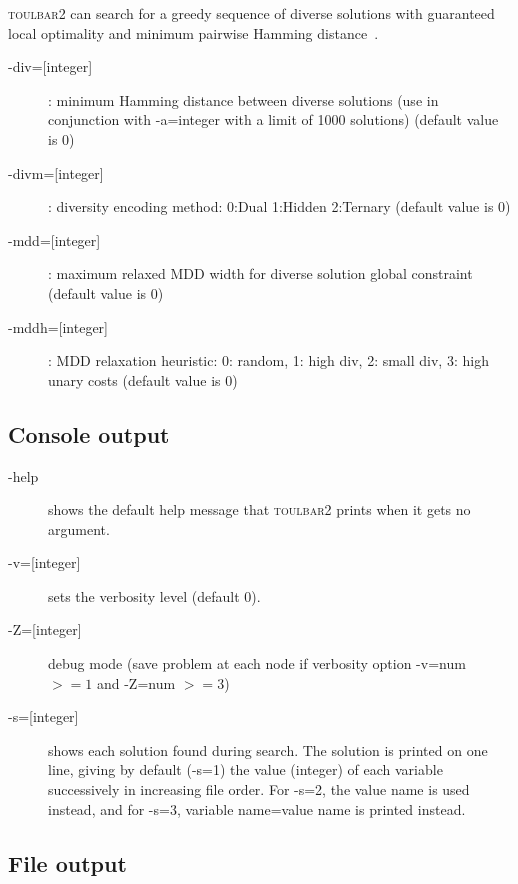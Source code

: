 \documentclass{article}
\def\toulbar2{\textsc{toulbar2}}
\begin{document}
\toulbar2 can search for a greedy sequence of diverse solutions with guaranteed local optimality and minimum pairwise Hamming distance~\cite{Ruffini19a}.

\begin{description}
\item[{-div=[integer]}] : minimum Hamming distance between diverse solutions (use in conjunction with -a=integer with a limit of 1000 solutions) (default value is 0)
\item[{-divm=[integer]}] : diversity encoding method: 0:Dual 1:Hidden 2:Ternary (default value is 0)
\item[{-mdd=[integer]}] : maximum relaxed MDD width for diverse solution global constraint (default value is 0)
\item[{-mddh=[integer]}] : MDD relaxation heuristic: 0: random, 1: high div, 2: small div, 3: high unary costs (default value is 0)
\end{description}

\subsection{Console output}

\begin{description}
\item[-help] shows the default help message that \toulbar2 prints when
  it gets no argument.
\item[{-v=[integer]}] sets the verbosity level (default 0).
\item[{-Z=[integer]}] debug mode (save problem at each node if verbosity
  option -v=num $>= 1$ and -Z=num $>=3$)
\item[{-s=[integer]}] shows each solution found during search. The solution is
  printed on one line, giving by default (-s=1) the value (integer) of each variable
  successively in increasing file order. For -s=2, the value name is used instead, and for -s=3, variable name=value name is printed instead.
\end{description}

\subsection{File output}
\end{document}
